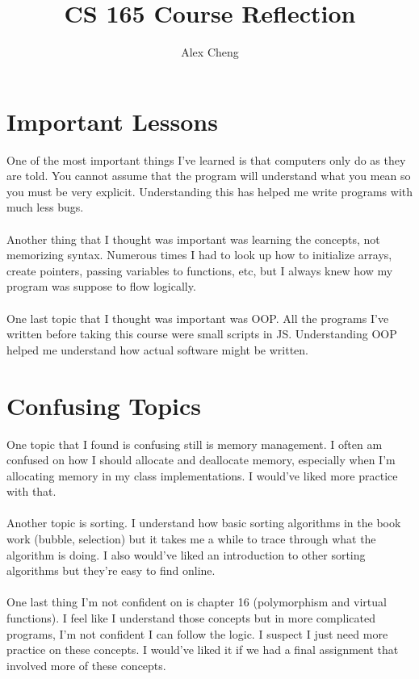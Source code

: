 \documentclass[]{article}
\title{CS 165 Course Reflection}
\author{Alex Cheng}
\begin{document}
\maketitle

\section*{Important Lessons}
One of the most important things I've learned is that computers only do as they are told. You cannot assume that the program will understand what you mean so you must be very explicit. Understanding this has helped me write programs with much less bugs.\\ \\
Another thing that I thought was important was learning the concepts, not memorizing syntax. Numerous times I had to look up how to initialize arrays, create pointers, passing variables to functions, etc, but I always knew how my program was suppose to flow logically.\\ \\ One last topic that I thought was important was OOP. All the programs I've written before taking this course were small scripts in JS. Understanding OOP helped me understand how actual software might be written.

\section*{Confusing Topics}
One topic that I found is confusing still is memory management. I often am confused on how I should allocate and deallocate memory, especially when I'm allocating memory in my class implementations. I would've liked more practice with that. \\ \\
Another topic is sorting. I understand how basic sorting algorithms in the book work (bubble, selection) but it takes me a while to trace through what the algorithm is doing. I also would've liked an introduction to other sorting algorithms but they're easy to find online.\\ \\
One last thing I'm not confident on is chapter 16 (polymorphism and virtual functions). I feel like I understand those concepts but in more complicated programs, I'm not confident I can follow the logic. I suspect I just need more practice on these concepts. I would've liked it if we had a final assignment that involved more of these concepts. 
\end{document}
